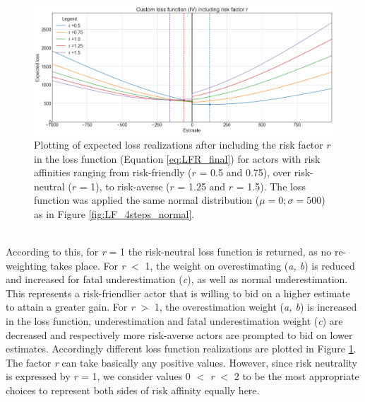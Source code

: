 		\begin{figure}[h]
			\centering
			\includegraphics[width=1\textwidth]{Figures/LFR_normal2.png}
			\caption{Plotting of expected loss realizations after including the risk factor $r$ in the loss function (Equation \ref{eq:LFR_final}) for actors with risk affinities ranging from risk-friendly ($r$ = 0.5 and 0.75), over risk-neutral ($r$ = 1), to risk-averse ($r$ = 1.25 and $r$ = 1.5). The loss function was applied the same normal distribution ($\mu=0; \sigma=500$) as in Figure \ref{fig:LF_4steps_normal}.}\label{fig:LFR_normal} 
		\end{figure}\\
		According to this, for \textit{r} = 1 the risk-neutral loss function is returned, as no re-weighting takes place. For \textit{r} $<$ 1, the weight on overestimating (\textit{a, b}) is reduced and increased for fatal underestimation (\textit{c}), as well as normal underestimation. This represents a risk-friendlier actor that is willing to bid on a higher estimate to attain a greater gain. For \textit{r} $>$ 1, the overestimation weight (\textit{a, b}) is increased in the loss function, underestimation and fatal underestimation weight (\textit{c}) are decreased and respectively more risk-averse actors are prompted to bid on lower estimates. Accordingly different loss function realizations are plotted in Figure \ref{fig:LFR_normal}.\\		
		The factor \textit{r} can take basically any positive values. However, since risk neutrality is expressed by \textit{r} = 1, we consider values 0 $<$ \textit{r} $<$ 2 to be the most appropriate choices to represent both sides of risk affinity equally here.		
		
